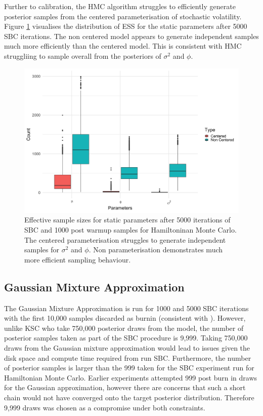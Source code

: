 \documentclass[12pt, a4paper]{article}
\begin{document}
    Further to calibration, the HMC algorithm struggles to efficiently generate posterior samples from the centered parameterisation of stochastic volatility. Figure \ref{fig:hmcess} visualises the distribution of ESS for the static parameters after 5000 SBC iterations. The non centered model appears to generate independent samples much more efficiently than the centered model. This is consistent with HMC struggliing to sample overall from the posteriors of $\sigma^2$ and $\phi$.

    \begin{figure}[H]
        \centering
        \includegraphics[scale=0.09]{results/hmc_ess.png}
        \caption{Effective sample sizes for static parameters after 5000 iterations of SBC and 1000 post warmup samples for Hamiltoninan Monte Carlo. The centered parameterisation struggles to generate independent samples for $\sigma^2$ and $\phi$. Non parameterisation demonstrates much more efficient sampling behaviour.}
        \label{fig:hmcess}
    \end{figure}

    \subsection{Gaussian Mixture Approximation}
    The Gaussian Mixture Approximation is run for 1000 and 5000 SBC iterations with the first 10,000 samples discarded as burnin (consistent with \citet{kim1998stochastic}). However, unlike KSC who take 750,000 posterior draws from the model, the number of posterior samples taken as part of the SBC procedure is 9,999. Taking 750,000 draws from the Gaussian mixture approximation would lead to issues given the disk space and compute time required from run SBC. Furthermore, the number of posterior samples is larger than the 999 taken for the SBC experiment run for Hamiltonian Monte Carlo. Earlier experiments attempted 999 post burn in draws for the Gaussian approximation, however there are concerns that such a short chain would not have converged onto the target posterior distribution. Therefore 9,999 draws was chosen as a compromise under both constraints. 
\end{document}
